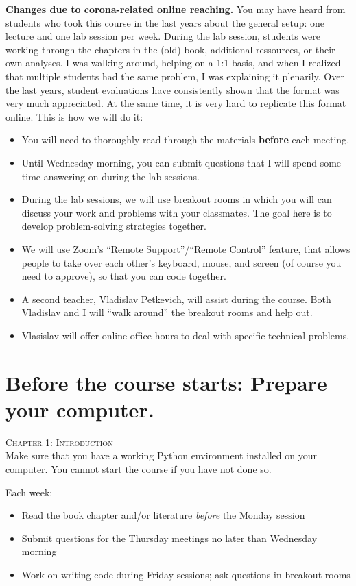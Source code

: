 \begin{corona}\noindent \textbf{Changes due to corona-related online reaching.} You may have heard from students who took this course in the last years about the general setup: one lecture and one lab session per week. During the lab session, students were working through the chapters in the (old) book,  additional ressources, or their own analyses. I was walking around, helping on a 1:1 basis, and when I realized that multiple students had the same problem, I was explaining it plenarily. Over the last years, student evaluations have consistently shown that the format was very much appreciated. At the same time, it is very hard to replicate this format online.
	This is how we will do it:

	\begin{itemize}
		\item You will need to thoroughly read through the materials \textbf{before} each meeting.
		\item Until Wednesday morning, you can submit questions that I will spend some time answering on during the lab sessions.
		\item During the lab sessions, we will use breakout rooms in which you will can discuss your work and problems with your classmates. The goal here is to develop problem-solving strategies together.
		\item We will use Zoom's ``Remote Support''/``Remote Control'' feature, that allows people to take over each other's keyboard, mouse, and screen (of course you need to approve), so that you can code together.
		\item A second teacher, Vladislav Petkevich, will assist during the course. Both Vladislav and I will ``walk around'' the breakout rooms and help out.
		\item Vlasislav will offer online office hours to deal with specific technical problems.
	\end{itemize}
\end{corona}

\section*{Before the course starts: Prepare your computer.}
\textsc{ Chapter 1: Introduction}\\
Make sure that you have a working Python environment installed on your computer. You cannot start the course if you have not done so.

\begin{corona}
	Each week:
	\begin{itemize}
		\item Read the book chapter and/or literature \emph{before} the Monday session
		\item Submit questions for the Thursday meetings no later than Wednesday morning
		\item Work on writing code during Friday sessions; ask questions in breakout rooms
	\end{itemize}
\end{corona}

